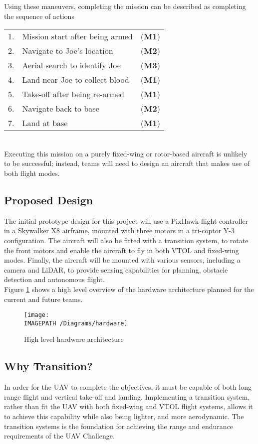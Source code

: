 Using these maneuvers, completing the mission can be described as completing the sequence of actions\\
\begin{tabular}{r l l}
	1. & Mission start after being armed & (\textbf{M1}) \\ 
	2. & Navigate to Joe's location & (\textbf{M2}) \\ 
	3. & Aerial search to identify Joe & (\textbf{M3}) \\ 
	4. & Land near Joe to collect blood & (\textbf{M1}) \\ 
	5. & Take-off after being re-armed & (\textbf{M1}) \\ 
	6. & Navigate back to base & (\textbf{M2}) \\ 
	7. & Land at base & (\textbf{M1}) \\ 
\end{tabular}\\

Executing this mission on a purely fixed-wing or rotor-based aircraft is unlikely to be successful; instead, teams will need to design an aircraft that makes use of both flight modes.

\subsection{Proposed Design}
The initial prototype design for this project will use a PixHawk flight controller in a Skywalker X8 airframe, mounted with three motors in a tri-coptor Y-3 configuration. The aircraft will also be fitted with a transition system, to rotate the front motors and enable the aircraft to fly in both VTOL and fixed-wing modes. Finally, the aircraft will be mounted with various sensors, including a camera and LiDAR, to provide sensing capabilities for planning, obstacle detection and autonomous flight.\\

Figure \ref{fig:hardwarearch-exec} shows a high level overview of the hardware architecture planned for the current and future teams.

\begin{figure}[!h]
	\centering
	\texttt{[image: \\IMAGEPATH /Diagrams/hardware]}
	\caption{High level hardware architecture}
	\label{fig:hardwarearch-exec}
\end{figure}

\subsection{Why Transition?}
In order for the UAV to complete the objectives, it must be capable of both long range flight and vertical take-off and landing. Implementing a transition system, rather than fit the UAV with both fixed-wing and VTOL flight systems, allows it to achieve this capability while also being lighter, and more aerodynamic. The transition systems is the foundation for achieving the range and endurance requirements of the UAV Challenge.

